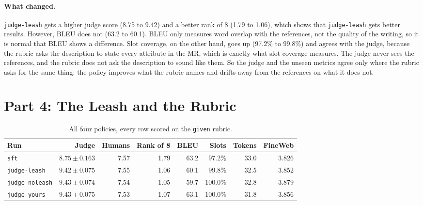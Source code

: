 \documentclass[10pt]{article}
\begin{document}
\paragraph{What changed.}
\texttt{judge-leash} gets a higher judge score (8.75 to 9.42) and a better
rank of 8 (1.79 to 1.06), which shows that \texttt{judge-leash} gets
better results. However, BLEU does not (63.2 to 60.1). BLEU only measures
word overlap with the references, not the quality of the writing, so it
is normal that BLEU shows a difference.
Slot coverage, on the other hand, goes up (97.2\% to 99.8\%) and agrees
with the judge, because the rubric asks the description to state every
attribute in the MR, which is exactly what slot coverage measures. The
judge never sees the references, and the rubric does not ask the
description to sound like them. So the judge and the unseen metrics agree
only where the rubric asks for the same thing: the policy improves what
the rubric names and drifts away from the references on what it does not.

\section*{Part 4: The Leash and the Rubric}

\begin{table}[htbp]
\caption{All four policies, every row scored on the \texttt{given} rubric.}
\label{tab:part4}
\centering
\small
\begin{tabular}{lrrrrrrr}
\toprule
Run & Judge & Humans & Rank of 8 & BLEU & Slots & Tokens & FineWeb \\
\midrule
\texttt{sft}           & $8.75 \pm 0.163$ & 7.57 & 1.79 & 63.2 & 97.2\% & 33.0 & 3.826 \\
\texttt{judge-leash}   & $9.42 \pm 0.075$ & 7.55 & 1.06 & 60.1 & 99.8\% & 32.5 & 3.852 \\
\texttt{judge-noleash} & $9.43 \pm 0.074$ & 7.54 & 1.05 & 59.7 & 100.0\% & 32.8 & 3.879 \\
\texttt{judge-yours}   & $9.43 \pm 0.075$ & 7.53 & 1.07 & 63.1 & 100.0\% & 31.8 & 3.856 \\
\bottomrule
\end{tabular}
\end{table}

\end{document}
